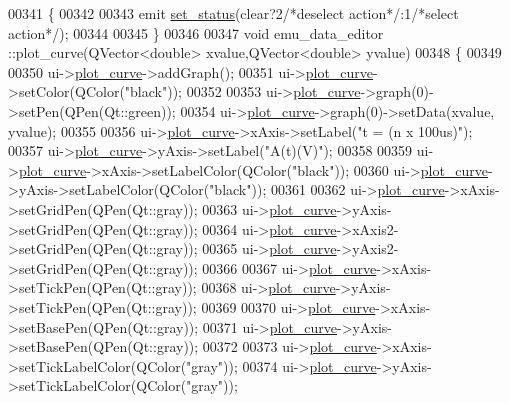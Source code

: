 \begin{DoxyCode}
00341 \{
00342 
00343     emit \hyperlink{a00004_a9476424a86a6ed4f84c64d0ac77143cc}{set\_status}(clear?2\textcolor{comment}{/*deselect action*/}:1\textcolor{comment}{/*select action*/});
00344 
00345 \}
00346 
00347 \textcolor{keywordtype}{void} emu\_data\_editor ::plot\_curve(QVector<double> xvalue,QVector<double> yvalue)
00348 \{
00349 
00350   ui->\hyperlink{a00026_a1d46308dee8db7e3c99af65f13055479}{plot\_curve}->addGraph();
00351   ui->\hyperlink{a00026_a1d46308dee8db7e3c99af65f13055479}{plot\_curve}->setColor(QColor(\textcolor{stringliteral}{"black"}));
00352 
00353   ui->\hyperlink{a00026_a1d46308dee8db7e3c99af65f13055479}{plot\_curve}->graph(0)->setPen(QPen(Qt::green));
00354   ui->\hyperlink{a00026_a1d46308dee8db7e3c99af65f13055479}{plot\_curve}->graph(0)->setData(xvalue, yvalue);
00355 
00356   ui->\hyperlink{a00026_a1d46308dee8db7e3c99af65f13055479}{plot\_curve}->xAxis->setLabel(\textcolor{stringliteral}{"t = (n x 100us)"});
00357   ui->\hyperlink{a00026_a1d46308dee8db7e3c99af65f13055479}{plot\_curve}->yAxis->setLabel(\textcolor{stringliteral}{"A(t)(V)"});
00358 
00359   ui->\hyperlink{a00026_a1d46308dee8db7e3c99af65f13055479}{plot\_curve}->xAxis->setLabelColor(QColor(\textcolor{stringliteral}{"black"}));
00360   ui->\hyperlink{a00026_a1d46308dee8db7e3c99af65f13055479}{plot\_curve}->yAxis->setLabelColor(QColor(\textcolor{stringliteral}{"black"}));
00361 
00362   ui->\hyperlink{a00026_a1d46308dee8db7e3c99af65f13055479}{plot\_curve}->xAxis->setGridPen(QPen(Qt::gray));
00363   ui->\hyperlink{a00026_a1d46308dee8db7e3c99af65f13055479}{plot\_curve}->yAxis->setGridPen(QPen(Qt::gray));
00364   ui->\hyperlink{a00026_a1d46308dee8db7e3c99af65f13055479}{plot\_curve}->xAxis2->setGridPen(QPen(Qt::gray));
00365   ui->\hyperlink{a00026_a1d46308dee8db7e3c99af65f13055479}{plot\_curve}->yAxis2->setGridPen(QPen(Qt::gray));
00366 
00367   ui->\hyperlink{a00026_a1d46308dee8db7e3c99af65f13055479}{plot\_curve}->xAxis->setTickPen(QPen(Qt::gray));
00368   ui->\hyperlink{a00026_a1d46308dee8db7e3c99af65f13055479}{plot\_curve}->yAxis->setTickPen(QPen(Qt::gray));
00369 
00370   ui->\hyperlink{a00026_a1d46308dee8db7e3c99af65f13055479}{plot\_curve}->xAxis->setBasePen(QPen(Qt::gray));
00371   ui->\hyperlink{a00026_a1d46308dee8db7e3c99af65f13055479}{plot\_curve}->yAxis->setBasePen(QPen(Qt::gray));
00372 
00373   ui->\hyperlink{a00026_a1d46308dee8db7e3c99af65f13055479}{plot\_curve}->xAxis->setTickLabelColor(QColor(\textcolor{stringliteral}{"gray"}));
00374   ui->\hyperlink{a00026_a1d46308dee8db7e3c99af65f13055479}{plot\_curve}->yAxis->setTickLabelColor(QColor(\textcolor{stringliteral}{"gray"}));

\end{DoxyCode}
